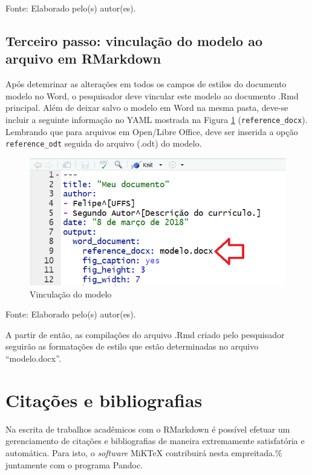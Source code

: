 \documentclass[12pt,brazil,]{book}
\begin{document}
Fonte: Elaborado pelo(s) autor(es).

\hypertarget{terceiro-passo-vinculacao-do-modelo-ao-arquivo-em-rmarkdown}{%
\subsection{Terceiro passo: vinculação do modelo ao arquivo em
RMarkdown}\label{terceiro-passo-vinculacao-do-modelo-ao-arquivo-em-rmarkdown}}

Após detemrinar as alterações em todos os campos de estilos do documento
modelo no Word, o pesquisador deve vincular este modelo ao documento
.Rmd principal. Além de deixar salvo o modelo em Word na mesma pasta,
deve-se incluir a seguinte informação no YAML mostrada na Figura
\ref{fig:rmarkestilos2} (\texttt{reference\_docx}). Lembrando que para
arquivos em Open/Libre Office, deve ser inserida a opção
\texttt{reference\_odt} seguida do arquivo (.odt) do modelo.

\begin{figure}

{\centering \includegraphics[width=0.6\linewidth]{rmarkestilos2} 

}

\caption{Vinculação do modelo}\label{fig:rmarkestilos2}
\end{figure}

Fonte: Elaborado pelo(s) autor(es).

A partir de então, as compilações do arquivo .Rmd criado pelo
pesquisador seguirão as formatações de estilo que estão determinadas no
arquivo ``modelo.docx''.

\hypertarget{citacoes-e-bibliografias}{%
\section{Citações e bibliografias}\label{citacoes-e-bibliografias}}

Na escrita de trabalhos acadêmicos com o RMarkdown é possível efetuar um
gerenciamento de citações e bibliografias de maneira extremamente
satisfatória e automática. Para isto, o \emph{software} MiKTeX
contribuirá nesta empreitada.\% juntamente com o programa Pandoc.
\end{document}
